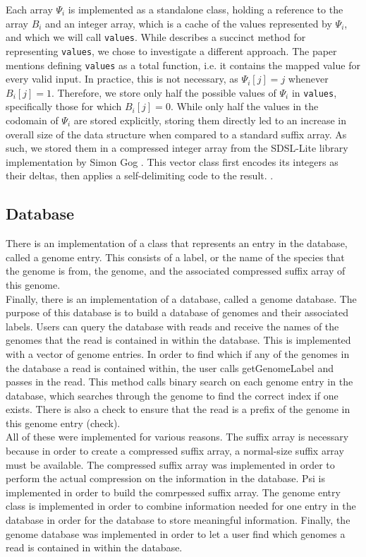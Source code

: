 \documentclass{article}
\begin{document}
\indent Each array $\Psi_i$ is implemented as a standalone class, holding a reference to the array $B_i$ and an integer array, which is a cache of the values represented by $\Psi_i$, and which we will call \texttt{values}. While \cite{GV05} describes a succinct method for representing \texttt{values}, we chose to investigate a different approach. The paper mentions defining \texttt{values} as a total function, i.e. it contains the mapped value for every valid input. In practice, this is not necessary, as $\Psi_i[j] = j$ whenever $B_i[j] = 1$. Therefore, we store only half the possible values of $\Psi_i$ in \texttt{values}, specifically those for which $B_i[j] = 0$. While only half the values in the codomain of $\Psi_i$ are stored explicitly, storing them directly led to an increase in overall size of the data structure when compared to a standard suffix array. As such, we stored them in a compressed integer array from the SDSL-Lite library implementation by Simon Gog \cite{SDSL}. This vector class first encodes its integers as their deltas, then applies a self-delimiting code to the result. \cite{OS07}.\\
\subsection{Database}
\label{subsec-db}
\indent There is an implementation of a class that represents an entry in the database, called a genome entry. This consists of a label, or the name of the species that the genome is from, the genome, and the associated compressed suffix array of this genome.\\
\indent Finally, there is an implementation of a database, called a genome database. The purpose of this database is to build a database of genomes and their associated labels. Users can query the database with reads and receive the names of the genomes that the read is contained in within the database. This is implemented with a vector of genome entries. In order to find which if any of the genomes in the database a read is contained within, the user calls getGenomeLabel and passes in the read. This method calls binary search on each genome entry in the database, which searches through the genome to find the correct index if one exists. There is also a check to ensure that the read is a prefix of the genome in this genome entry (check).\\
\indent All of these were implemented for various reasons. The suffix array is necessary because in order to create a compressed suffix array, a normal-size suffix array must be available. The compressed suffix array was implemented in order to perform the actual compression on the information in the database. Psi is implemented in order to build the comrpessed suffix array. The genome entry class is implemented in order to combine information needed for one entry in the database in order for the database to store meaningful information. Finally, the genome database was implemented in order to let a user find which genomes a read is contained in within the database.\\
\end{document}
